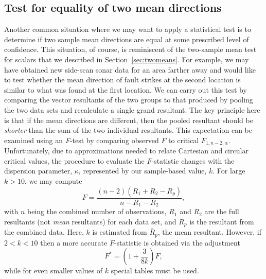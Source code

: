 \subsection{Test for equality of two mean directions}
\label{sec:twoDdir}
	Another common situation where we may want to apply a statistical test is to determine if two 
sample mean directions are equal at some prescribed level of confidence.  This situation, of course, is
reminiscent of the two-sample mean test for scalars that we described in Section~\ref{sec:twomeans}. For example, we may 
have obtained new side-scan sonar data for an area farther away and would like to test whether the 
mean direction of fault strikes at the second location is similar to what was found at the first location.
We can carry out this 
test by comparing the vector resultants of the two groups to that produced by pooling the
two data sets and recalculate a single grand resultant.  The key principle here
is that if the mean directions are different, then the pooled resultant should be \emph{shorter} than
the sum of the two individual resultants.  This expectation can be examined using an \emph{F}-test by
comparing observed $F$ to critical $F_{1,n-2,\alpha}$.  Unfortunately,
due to approximations needed to relate Cartesian and circular critical values, the procedure to evaluate
the $F$-statistic changes with the dispersion parameter, $\kappa$, represented by our sample-based value, $k$.
For large $k > 10$, we may compute
\begin{equation}
F = \frac{(n-2)(R_1 + R_2 - R_p)}{n - R_1 -R_2},
\end{equation}
with $n$ being the combined number of observations, $R_1$ and $R_2$ are the full resultants (not \emph{mean} resultants)
for each data set, and
$R_p$ is the resultant from the combined data. Here, $k$ is estimated from $\bar{R}_p$, the mean resultant.
However, if $2 < k < 10$ then a more accurate $F$-statistic is obtained via the adjustment
\begin{equation}
F^{\ast} = \left(1 + \frac{3}{8k} \right) F,
\label{eq:betterFk}
\end{equation}
while for even smaller values of $k$ special tables must be used.
